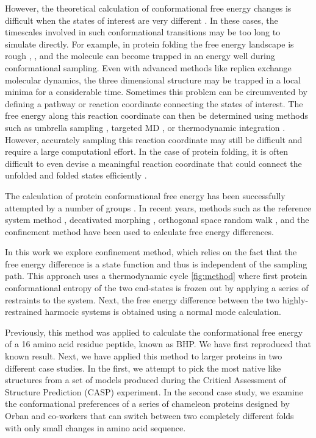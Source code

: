\documentclass[12pt]{article}
\begin{document}
However, the theoretical calculation of conformational free energy changes is difficult when the
states of interest are very different \cite{Meirovitch2007}. In these cases, the timescales involved
in such conformational transitions may be too long to simulate directly. For example, in protein
folding the free energy landscape is rough \cite{Dill1997}, \cite{Dill2008}, and the molecule can
become trapped in an energy well during conformational sampling. Even with advanced methods like
replica exchange molecular dynamics, the three dimensional structure may be trapped in a local
minima for a considerable time. Sometimes this problem can be circumvented by defining a pathway or
reaction coordinate connecting the states of interest. The free energy along this reaction
coordinate can then be determined using methods such as umbrella sampling \cite{Torrie1977},
targeted MD \cite{}, or thermodynamic integration \cite{Tironi1994}. However, accurately sampling
this reaction coordinate may still be difficult and require a large computationl effort. In the case
of protein folding, it is often difficult to even devise a meaningful reaction coordinate that could
connect the unfolded and folded states efficiently \cite{}.

The calculation of protein conformational free energy has been successfully attempted by a number of
groups \cite{Meirovitch2007,Ytreberg2006,Zheng2008}. In recent years, methods such as the reference
system method \cite{Ytreberg2006}, decativated morphing \cite{Park2008}, orthogonal space random
walk \cite{Zheng2008}, and the confinement method \cite{Tyka2006,Cecchini2009} have been used to
calculate free energy differences.

In this work we explore confinement method\cite{Tyka2006,Cecchini2009}, which relies on the fact
that the free energy difference is a state function and thus is independent of the sampling path.
This approach uses a thermodynamic cycle \ref{fig:method} where first protein conformational entropy
of the two end-states is frozen out by applying a series of restraints to the system. Next, the free
energy difference between the two highly-restrained harmocic systems is obtained using a normal mode
calculation.

Previously, this method was applied to calculate the conformational free energy of a 16 amino acid
residue peptide, known as BHP.  We have first reproduced that known result. Next, we have applied
this method to larger proteins in two different case studies. In the first, we attempt to pick the
most native like structures from a set of models produced during the Critical Assessment of
Structure Prediction (CASP) \cite{} experiment. In the second case study, we examine the
conformational preferences of a series of chameleon proteins designed by Orban and co-workers
\cite{} that can switch between two completely different folds with only small changes in amino acid
sequence.
\end{document}
